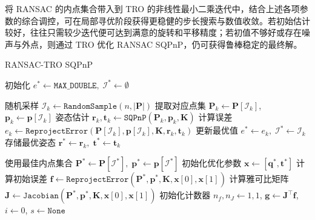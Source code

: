 将 RANSAC 的内点集合带入到 TRO 的非线性最小二乘迭代中，结合上述各项参数的综合调控，可在局部寻优阶段获得更稳健的步长搜索与数值收敛。若初始估计较好，往往只需较少迭代便可达到满意的旋转和平移精度；若初值不够好或存在噪声与外点，则通过 TRO 优化 RANSAC SQPnP，仍可获得鲁棒稳定的最终解。
\begin{algorithm}[!htbp]
	\caption{RANSAC-TRO SQPnP}
	\label{alg:RANSAC_TRO_SQPnP}
	\begin{spacing}{0.9}  %
		\footnotesize        %
		\begin{algorithmic}[1]
			
			\State 初始化 $e^* \gets \texttt{MAX\_DOUBLE},\;\mathcal{I}^* \gets \emptyset$
			
			\State 随机采样 $\mathcal{I}_k \gets \texttt{RandomSample}(n, |\mathbf{P}|)$
			\State 提取对应点集 $\mathbf{P}_k \gets \mathbf{P}[\mathcal{I}_k]$, $\mathbf{p}_k \gets \mathbf{p}[\mathcal{I}_k]$
			\State 姿态估计 $\mathbf{r}_k, \mathbf{t}_k \gets \texttt{SQPnP}(\mathbf{P}_k, \mathbf{p}_k, \mathbf{K})$
			\State 计算误差 $e_k \gets \texttt{ReprojectError}(\mathbf{P}[\mathcal{I}_k], \mathbf{p}[\mathcal{I}_k], \mathbf{K}, \mathbf{r}_k, \mathbf{t}_k)$
			\State 更新最优值 $e^* \gets e_k,\;\mathcal{I}^* \gets \mathcal{I}_k$
			\State 存储最优姿态 $\mathbf{r}^* \gets \mathbf{r}_k,\;\mathbf{t}^* \gets \mathbf{t}_k$
			\EndIf
			\EndFor
			
			\State 使用最佳内点集合 $\mathbf{P}^* \gets \mathbf{P}[\mathcal{I}^*],\;\mathbf{p}^* \gets \mathbf{p}[\mathcal{I}^*]$
			\State 初始化优化参数 $\mathbf{x} \gets [\mathbf{q}^*, \mathbf{t}^*]$
			\State 计算初始误差 $\mathbf{f} \gets \texttt{ReprojectError}(\mathbf{P}^*, \mathbf{p}^*, \mathbf{K}, \mathbf{x}[0], \mathbf{x}[1])$
			\State 计算雅可比矩阵 $\mathbf{J} \gets \texttt{Jacobian}(\mathbf{P}^*, \mathbf{p}^*, \mathbf{K}, \mathbf{x}[0], \mathbf{x}[1])$
			\State 初始化计数器 $n_f, n_J \gets 1, 1$, $\mathbf{g} \gets \mathbf{J}^\top \mathbf{f}$, $i \gets 0$, $s \gets \texttt{None}$
			

\end{algorithmic}
\end{spacing}
\end{algorithm}
